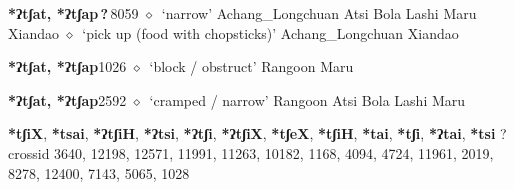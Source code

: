   \begin{list}{}{\leftmargin=1.5em \itemindent=-1.5em}
  \item {\footnotesize \textbf{*ʔtʃat, *ʔtʃap\,?\,}}{\tiny 8059}
         $\diamond$~`narrow'
         Achang\_Longchuan 
\hspace{1ex}
         Atsi 
\hspace{1ex}
         Bola 
\hspace{1ex}
         Lashi 
\hspace{1ex}
         Maru 
\hspace{1ex}
         Xiandao 
\hspace{1ex}
         $\diamond$~`pick up (food with chopsticks)'
         Achang\_Longchuan 
\hspace{1ex}
         Xiandao 
  \item {\footnotesize \textbf{*ʔtʃat, *ʔtʃap}}{\tiny 1026}
\hspace{1ex}
         $\diamond$~`block / obstruct'
         Rangoon 
\hspace{1ex}
         Maru 
  \item {\footnotesize \textbf{*ʔtʃat, *ʔtʃap}}{\tiny 2592}
\hspace{1ex}
         $\diamond$~`cramped / narrow'
         Rangoon 
\hspace{1ex}
         Atsi 
\hspace{1ex}
         Bola 
\hspace{1ex}
         Lashi 
\hspace{1ex}
         Maru 
  \end{list}
\item
\textbf{*tʃiX}, \textbf{*tsai}, \textbf{*ʔtʃiH}, \textbf{*ʔtsi}, \textbf{*ʔtʃi}, \textbf{*ʔtʃiX}, \textbf{*tʃeX}, \textbf{*tʃiH}, \textbf{*tai}, \textbf{*tʃi}, \textbf{*ʔtai}, \textbf{*tsi}
?
  {\tiny crossid 3640, 12198, 12571, 11991, 11263, 10182, 1168, 4094, 4724, 11961, 2019, 8278, 12400, 7143, 5065, 1028}
